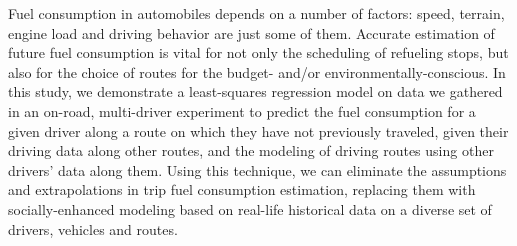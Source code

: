 Fuel consumption in automobiles depends on a number of factors: speed, terrain, engine load and driving behavior are just some of them. Accurate estimation of future fuel consumption is vital for not only the scheduling of refueling stops, but also for the choice of routes for the budget- and/or environmentally-conscious. In this study, we demonstrate a least-squares regression model on data we gathered in an on-road, multi-driver experiment to predict the fuel consumption for a given driver along a route on which they have not previously traveled, given their driving data along other routes, and the modeling of driving routes using other drivers' data along them. Using this technique, we can eliminate the assumptions and extrapolations in trip fuel consumption estimation, replacing them with socially-enhanced modeling based on real-life historical data on a diverse set of drivers, vehicles and routes.